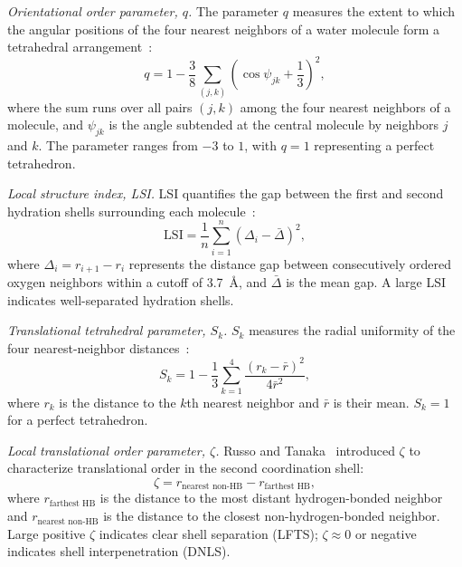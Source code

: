 \documentclass[aps, amsmath,amssymb, reprint, twocolumn, superscriptaddress]{revtex4-2}
\begin{document}
\textit{Orientational order parameter, $q$.} The parameter $q$ measures the extent to which the angular positions of the four nearest neighbors of a water molecule form a tetrahedral arrangement~\cite{chau_new_1998,errington_relationship_2001}:
\begin{equation}
q = 1 - \frac{3}{8}\sum_{(j,k)}\left(\cos\psi_{jk}+\frac{1}{3}\right)^{2},
\label{eq:q}
\end{equation}
where the sum runs over all pairs $(j,k)$ among the four nearest neighbors of a molecule, and $\psi_{jk}$ is the angle subtended at the central molecule by neighbors $j$ and $k$. The parameter ranges from $-3$ to $1$, with $q=1$ representing a perfect tetrahedron.

\textit{Local structure index, LSI.} LSI quantifies the gap between the first and second hydration shells surrounding each molecule~\cite{shiratani_growth_1996}:
\begin{equation}
\text{LSI} = \frac{1}{n}\sum_{i=1}^{n}\!\left(\Delta_i - \bar{\Delta}\right)^{2},
\label{eq:LSI}
\end{equation}
where $\Delta_i = r_{i+1} - r_i$ represents the distance gap between consecutively ordered oxygen neighbors within a cutoff of 3.7~\AA, and $\bar{\Delta}$ is the mean gap. A large LSI indicates well-separated hydration shells.

\textit{Translational tetrahedral parameter, $S_k$.} $S_k$ measures the radial uniformity of the four nearest-neighbor distances~\cite{duboue-dijon_characterization_2015}:
\begin{equation}
S_k = 1 - \frac{1}{3}\sum_{k=1}^{4}\frac{(r_k - \bar{r})^{2}}{4\bar{r}^{2}},
\label{eq:Sk}
\end{equation}
where $r_k$ is the distance to the $k$th nearest neighbor and $\bar{r}$ is their mean. $S_k = 1$ for a perfect tetrahedron.

\textit{Local translational order parameter, $\zeta$.} Russo and Tanaka~\cite{russo_understanding_2014} introduced $\zeta$ to characterize translational order in the second coordination shell:
\begin{equation}
\zeta = r_{\text{nearest non-HB}} - r_{\text{farthest HB}},
\label{eq:zeta}
\end{equation}
where $r_{\text{farthest HB}}$ is the distance to the most distant hydrogen-bonded neighbor and $r_{\text{nearest non-HB}}$ is the distance to the closest non-hydrogen-bonded neighbor. Large positive $\zeta$ indicates clear shell separation (LFTS); $\zeta \approx 0$ or negative indicates shell interpenetration (DNLS).
\end{document}
